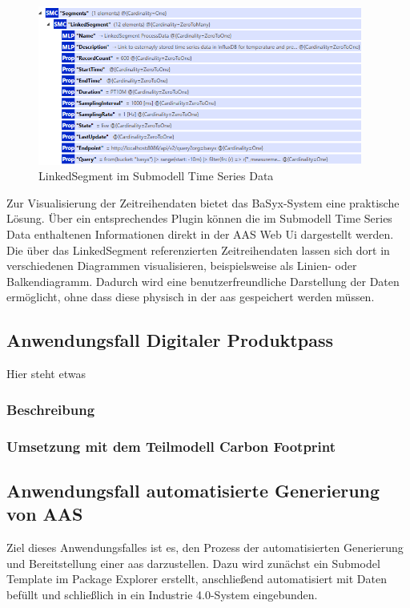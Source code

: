 \begin{figure}[htbp]
    \centering
    \includegraphics[width=0.95\textwidth]{Bilder/TimeSeries/LinkedSegment.PNG}
    \caption{LinkedSegment im Submodell Time Series Data}
    \label{fig:LinkedSegmentTimeSeries}
\end{figure}

Zur Visualisierung der Zeitreihendaten bietet das BaSyx-System eine praktische Lösung.
Über ein entsprechendes Plugin können die im Submodell Time Series Data enthaltenen Informationen direkt in der AAS Web Ui dargestellt werden.
Die über das LinkedSegment referenzierten Zeitreihendaten lassen sich dort in verschiedenen Diagrammen visualisieren, beispielsweise als Linien- oder Balkendiagramm.
Dadurch wird eine benutzerfreundliche Darstellung der Daten ermöglicht, ohne dass diese physisch in der \acs{aas} gespeichert werden müssen.

\subsection{Anwendungsfall Digitaler Produktpass}
Hier steht etwas
\subsubsection{Beschreibung}
\subsubsection{Umsetzung mit dem Teilmodell Carbon Footprint}

\subsection{Anwendungsfall automatisierte Generierung von AAS}
Ziel dieses Anwendungsfalles ist es, den Prozess der automatisierten Generierung und Bereitstellung einer \acs{aas} darzustellen.
Dazu wird zunächst ein Submodel Template im Package Explorer erstellt, anschließend automatisiert mit Daten befüllt und schließlich in ein Industrie 4.0-System eingebunden.
\newpage


